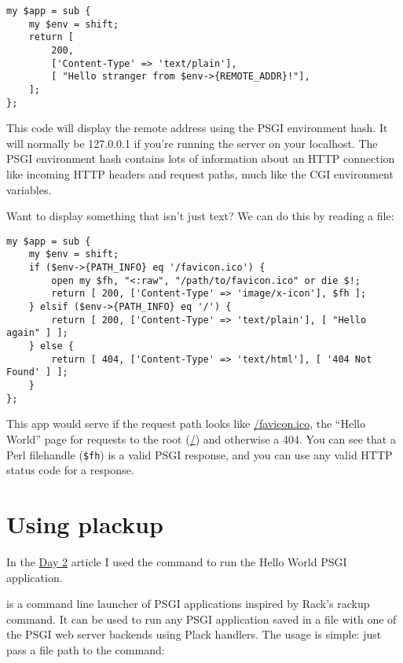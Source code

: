 \begin{lstlisting}
my $app = sub {
    my $env = shift;
    return [
        200,
        ['Content-Type' => 'text/plain'],
        [ "Hello stranger from $env->{REMOTE_ADDR}!"],
    ];
};
\end{lstlisting}

This code will display the remote address using the PSGI environment
hash. It will normally be 127.0.0.1 if you're running the server on your
localhost. The PSGI environment hash contains lots of information about
an HTTP connection like incoming HTTP headers and request paths, much
like the CGI environment variables.

Want to display something that isn't just text? We can do this by
reading a file:

\begin{lstlisting}
my $app = sub {
    my $env = shift;
    if ($env->{PATH_INFO} eq '/favicon.ico') {
        open my $fh, "<:raw", "/path/to/favicon.ico" or die $!;
        return [ 200, ['Content-Type' => 'image/x-icon'], $fh ];
    } elsif ($env->{PATH_INFO} eq '/') {
        return [ 200, ['Content-Type' => 'text/plain'], [ "Hello again" ] ];
    } else {
        return [ 404, ['Content-Type' => 'text/html'], [ '404 Not Found' ] ];
    }
};
\end{lstlisting}

This app would serve  if the request path looks like
\url{/favicon.ico}, the ``Hello World'' page for requests to the root (\url{/}) and
otherwise a 404. You can see that a Perl filehandle (\lstinline!$fh!) is
a valid PSGI response, and you can use any valid HTTP status code for a
response.

\chapter{Using plackup}\label{day-3-using-plackup}

In the
\href{http://advent.plackperl.org/2009/12/day-2-hello-world.html}{Day 2}
article I used the  command to run the Hello World PSGI
application.

 is a command line launcher of PSGI applications inspired by
Rack's rackup command. It can be used to run any PSGI application saved
in a  file with one of the PSGI web server backends using Plack
handlers. The usage is simple: just pass a  file path to the
command:


